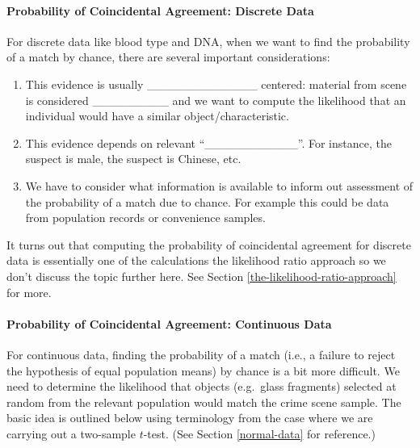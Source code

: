 \documentclass[]{book}
\providecommand{\tightlist}{%
  \setlength{\itemsep}{0pt}\setlength{\parskip}{0pt}}
\let\oldparagraph\paragraph
\renewcommand{\paragraph}[1]{\oldparagraph{#1}\mbox{}}
\theoremstyle{definition}
\theoremstyle{definition}
\theoremstyle{remark}
\begin{document}
\paragraph{Probability of Coincidental Agreement: Discrete
Data}\label{probability-of-coincidental-agreement-discrete-data}

For discrete data like blood type and DNA, when we want to find the
probability of a match by chance, there are several important
considerations:

\begin{enumerate}
\def\labelenumi{\arabic{enumi}.}
\tightlist
\item
  This evidence is usually \_\_\_\_\_\_\_\_\_\_\_\_\_ centered: material
  from scene is considered \_\_\_\_\_\_\_\_\_ and we want to compute the
  likelihood that an individual would have a similar
  object/characteristic. \vspace{.1in}
\item
  This evidence depends on relevant ``\_\_\_\_\_\_\_\_\_\_\_''. For
  instance, the suspect is male, the suspect is Chinese, etc.
  \vspace{.1in}
\item
  We have to consider what information is available to inform out
  assessment of the probability of a match due to chance. For example
  this could be data from population records or convenience samples.
\end{enumerate}

It turns out that computing the probability of coincidental agreement
for discrete data is essentially one of the calculations the likelihood
ratio approach so we don't discuss the topic further here. See Section
\ref{the-likelihood-ratio-approach} for more.

\paragraph{Probability of Coincidental Agreement: Continuous
Data}\label{probability-of-coincidental-agreement-continuous-data}

For continuous data, finding the probability of a match (i.e., a failure
to reject the hypothesis of equal population means) by chance is a bit
more difficult. We need to determine the likelihood that objects
(e.g.~glass fragments) selected at random from the relevant population
would match the crime scene sample. The basic idea is outlined below
using terminology from the case where we are carrying out a two-sample
\(t\)-test. (See Section \ref{normal-data} for reference.)
\end{document}
